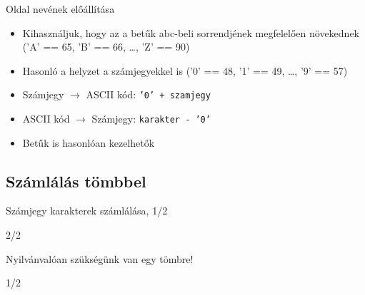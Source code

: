 \documentclass[usenames,dvipsnames,aspectratio=169]{beamer}
\begin{document}
\begin{frame}
  Oldal nevének előállítása
  \begin{itemize}
    \item Kihasználjuk, hogy az  a betűk abc-beli sorrendjének megfelelően növekednek ('A' == 65, 'B' == 66, 
\dots, 'Z' == 90)
    \item Hasonló a helyzet a számjegyekkel is ('0' == 48, '1' == 49, \dots, '9' == 57)
    \item Számjegy $\to$ ASCII kód: \texttt{'0' + szamjegy}
    \item ASCII kód $\to$ Számjegy: \texttt{karakter - '0'}
    \item Betűk is hasonlóan kezelhetők
  \end{itemize}
\end{frame}

\subsection{Számlálás tömbbel}
\begin{frame}
  \begin{exampleblock}{ Számjegy karakterek számlálása, 1/2}
    \tiny
    \vspace{-.2cm}
    
    \vspace{-.2cm}
  \end{exampleblock}
\end{frame}

\begin{frame}
  \begin{exampleblock}{ 2/2}
    \tiny
    
  \end{exampleblock}
  \vfill
  Nyilvánvalóan szükségünk van egy tömbre!
\end{frame}

\begin{frame}
  \begin{exampleblock}{ 1/2}
    \footnotesize
    \vspace{-.2cm}
    
    \vspace{-.2cm}
  \end{exampleblock}
\end{frame}
\end{document}
